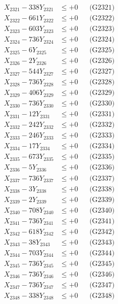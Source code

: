 \documentclass[a4paper,10pt]{article}
\begin{document}
{\begin{align}
\allowbreak
X_{2321} - 338Y_{2321} &\leq +0 && \text{(G2321)} \\
X_{2322} - 661Y_{2322} &\leq +0 && \text{(G2322)} \\
X_{2323} - 603Y_{2323} &\leq +0 && \text{(G2323)} \\
X_{2324} - 736Y_{2324} &\leq +0 && \text{(G2324)} \\
X_{2325} - 6Y_{2325} &\leq +0 && \text{(G2325)} \\
X_{2326} - 2Y_{2326} &\leq +0 && \text{(G2326)} \\
X_{2327} - 544Y_{2327} &\leq +0 && \text{(G2327)} \\
X_{2328} - 736Y_{2328} &\leq +0 && \text{(G2328)} \\
X_{2329} - 406Y_{2329} &\leq +0 && \text{(G2329)} \\
X_{2330} - 736Y_{2330} &\leq +0 && \text{(G2330)} \\
\allowbreak
X_{2331} - 12Y_{2331} &\leq +0 && \text{(G2331)} \\
X_{2332} - 242Y_{2332} &\leq +0 && \text{(G2332)} \\
X_{2333} - 246Y_{2333} &\leq +0 && \text{(G2333)} \\
X_{2334} - 17Y_{2334} &\leq +0 && \text{(G2334)} \\
X_{2335} - 673Y_{2335} &\leq +0 && \text{(G2335)} \\
X_{2336} - 5Y_{2336} &\leq +0 && \text{(G2336)} \\
X_{2337} - 736Y_{2337} &\leq +0 && \text{(G2337)} \\
X_{2338} - 3Y_{2338} &\leq +0 && \text{(G2338)} \\
X_{2339} - 2Y_{2339} &\leq +0 && \text{(G2339)} \\
X_{2340} - 708Y_{2340} &\leq +0 && \text{(G2340)} \\
\allowbreak
X_{2341} - 736Y_{2341} &\leq +0 && \text{(G2341)} \\
X_{2342} - 618Y_{2342} &\leq +0 && \text{(G2342)} \\
X_{2343} - 38Y_{2343} &\leq +0 && \text{(G2343)} \\
X_{2344} - 703Y_{2344} &\leq +0 && \text{(G2344)} \\
X_{2345} - 736Y_{2345} &\leq +0 && \text{(G2345)} \\
X_{2346} - 736Y_{2346} &\leq +0 && \text{(G2346)} \\
X_{2347} - 736Y_{2347} &\leq +0 && \text{(G2347)} \\
X_{2348} - 338Y_{2348} &\leq +0 && \text{(G2348)} \\

\end{align}}
\end{document}
